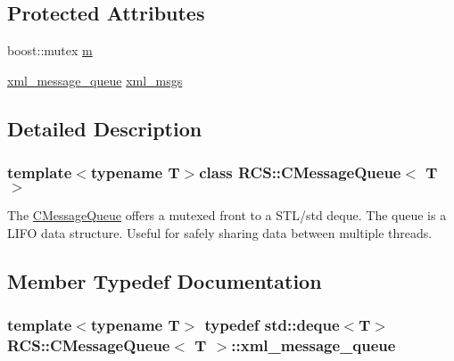 \subsection*{Protected Attributes}
\begin{DoxyCompactItemize}
\item 
boost\-::mutex \hyperlink{classRCS_1_1CMessageQueue_a874fdf08657e4ca2da89168bb6176c49}{m}
\item 
\hyperlink{classRCS_1_1CMessageQueue_a272ec6240c0ae616f66e71a033326e28}{xml\-\_\-message\-\_\-queue} \hyperlink{classRCS_1_1CMessageQueue_aa699f0b2f9f057242c5f0d3882f14ecb}{xml\-\_\-msgs}
\end{DoxyCompactItemize}


\subsection{Detailed Description}
\subsubsection*{template$<$typename T$>$class R\-C\-S\-::\-C\-Message\-Queue$<$ T $>$}

The \hyperlink{classRCS_1_1CMessageQueue}{C\-Message\-Queue} offers a mutexed front to a S\-T\-L/std deque. The queue is a L\-I\-F\-O data structure. Useful for safely sharing data between multiple threads. 

\subsection{Member Typedef Documentation}
\hypertarget{classRCS_1_1CMessageQueue_a272ec6240c0ae616f66e71a033326e28}{
\subsubsection[{xml\-\_\-message\-\_\-queue}]{\setlength{\rightskip}{0pt plus 5cm}template$<$typename T$>$ typedef std\-::deque$<$T$>$ {\bf R\-C\-S\-::\-C\-Message\-Queue}$<$ T $>$\-::{\bf xml\-\_\-message\-\_\-queue}}}\label{classRCS_1_1CMessageQueue_a272ec6240c0ae616f66e71a033326e28}



